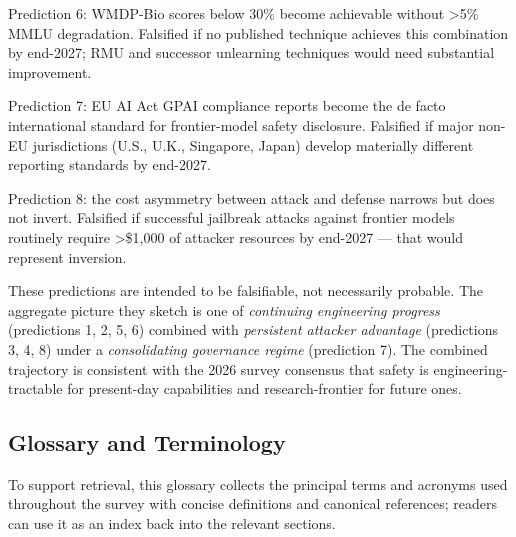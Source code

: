 \documentclass{article}
\begin{document}
Prediction 6: WMDP-Bio scores below 30\% become achievable without \textgreater5\% MMLU degradation. Falsified if no published technique achieves this combination by end-2027; RMU and successor unlearning techniques would need substantial improvement.

Prediction 7: EU AI Act GPAI compliance reports become the de facto international standard for frontier-model safety disclosure. Falsified if major non-EU jurisdictions (U.S., U.K., Singapore, Japan) develop materially different reporting standards by end-2027.

Prediction 8: the cost asymmetry between attack and defense narrows but does not invert. Falsified if successful jailbreak attacks against frontier models routinely require \textgreater\$1,000 of attacker resources by end-2027 --- that would represent inversion.

These predictions are intended to be falsifiable, not necessarily probable. The aggregate picture they sketch is one of \emph{continuing engineering progress} (predictions 1, 2, 5, 6) combined with \emph{persistent attacker advantage} (predictions 3, 4, 8) under a \emph{consolidating governance regime} (prediction 7). The combined trajectory is consistent with the 2026 survey consensus that safety is engineering-tractable for present-day capabilities and research-frontier for future ones.

\subsection{Glossary and Terminology}\label{glossary-and-terminology}

To support retrieval, this glossary collects the principal terms and acronyms used throughout the survey with concise definitions and canonical references; readers can use it as an index back into the relevant sections.
\end{document}
